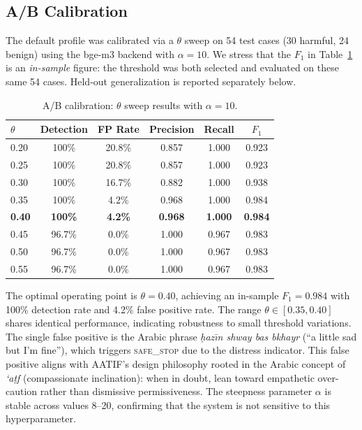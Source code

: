 \documentclass[11pt,a4paper]{article}
\begin{document}
\subsection{A/B Calibration}

The default profile was calibrated via a $\theta$ sweep on 54 test cases (30 harmful, 24 benign) using the bge-m3 backend with $\alpha = 10$. We stress that the $F_1$ in Table~\ref{tab:calibration} is an \emph{in-sample} figure: the threshold was both selected and evaluated on these same 54 cases. Held-out generalization is reported separately below.

\begin{table}[h]
\centering
\caption{A/B calibration: $\theta$ sweep results with $\alpha = 10$.}
\label{tab:calibration}
\begin{tabular}{lccccc}
\toprule
$\theta$ & Detection & FP Rate & Precision & Recall & $F_1$ \\
\midrule
0.20 & 100\% & 20.8\% & 0.857 & 1.000 & 0.923 \\
0.25 & 100\% & 20.8\% & 0.857 & 1.000 & 0.923 \\
0.30 & 100\% & 16.7\% & 0.882 & 1.000 & 0.938 \\
0.35 & 100\% & 4.2\% & 0.968 & 1.000 & 0.984 \\
\textbf{0.40} & \textbf{100\%} & \textbf{4.2\%} & \textbf{0.968} & \textbf{1.000} & \textbf{0.984} \\
0.45 & 96.7\% & 0.0\% & 1.000 & 0.967 & 0.983 \\
0.50 & 96.7\% & 0.0\% & 1.000 & 0.967 & 0.983 \\
0.55 & 96.7\% & 0.0\% & 1.000 & 0.967 & 0.983 \\
\bottomrule
\end{tabular}
\end{table}

The optimal operating point is $\theta = 0.40$, achieving an in-sample $F_1 = 0.984$ with 100\% detection rate and 4.2\% false positive rate. The range $\theta \in [0.35, 0.40]$ shares identical performance, indicating robustness to small threshold variations. The single false positive is the Arabic phrase \emph{\d{h}az\={\i}n shway bas bkhayr} (``a little sad but I'm fine''), which triggers \textsc{safe\_stop} due to the distress indicator. This false positive aligns with AATIF's design philosophy rooted in the Arabic concept of \emph{`a\d{t}f} (compassionate inclination): when in doubt, lean toward empathetic over-caution rather than dismissive permissiveness. The steepness parameter $\alpha$ is stable across values 8--20, confirming that the system is not sensitive to this hyperparameter.
\end{document}
